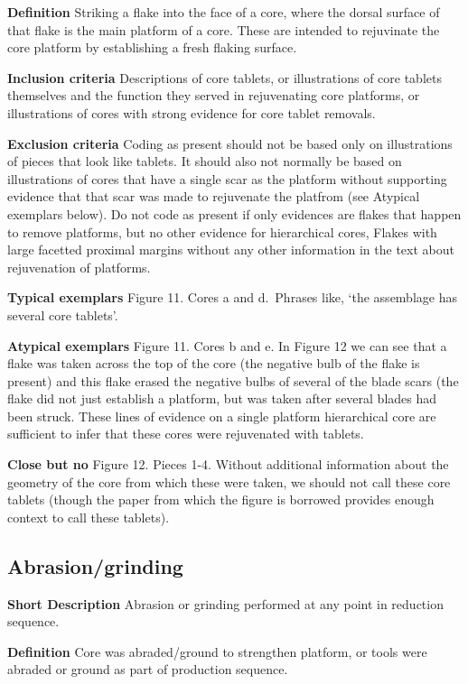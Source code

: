 \documentclass[
]{article}
\begin{document}
\textbf{Definition} Striking a flake into the face of a core, where the
dorsal surface of that flake is the main platform of a core. These are
intended to rejuvinate the core platform by establishing a fresh flaking
surface.

\textbf{Inclusion criteria} Descriptions of core tablets, or
illustrations of core tablets themselves and the function they served in
rejuvenating core platforms, or illustrations of cores with strong
evidence for core tablet removals.

\textbf{Exclusion criteria} Coding as present should not be based only
on illustrations of pieces that look like tablets. It should also not
normally be based on illustrations of cores that have a single scar as
the platform without supporting evidence that that scar was made to
rejuvenate the platfrom (see Atypical exemplars below). Do not code as
present if only evidences are flakes that happen to remove platforms,
but no other evidence for hierarchical cores, Flakes with large facetted
proximal margins without any other information in the text about
rejuvenation of platforms.

\textbf{Typical exemplars} Figure 11. Cores a and d.~Phrases like, `the
assemblage has several core tablets'.

\textbf{Atypical exemplars} Figure 11. Cores b and e. In Figure 12 we
can see that a flake was taken across the top of the core (the negative
bulb of the flake is present) and this flake erased the negative bulbs
of several of the blade scars (the flake did not just establish a
platform, but was taken after several blades had been struck. These
lines of evidence on a single platform hierarchical core are sufficient
to infer that these cores were rejuvenated with tablets.

\textbf{Close but no} Figure 12. Pieces 1-4. Without additional
information about the geometry of the core from which these were taken,
we should not call these core tablets (though the paper from which the
figure is borrowed provides enough context to call these tablets).

\hypertarget{abrasiongrinding}{%
\subsection{Abrasion/grinding}\label{abrasiongrinding}}

\textbf{Short Description} Abrasion or grinding performed at any point
in reduction sequence.

\textbf{Definition} Core was abraded/ground to strengthen platform, or
tools were abraded or ground as part of production sequence.
\end{document}
